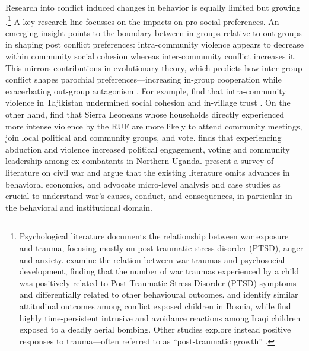 Research into conflict induced changes in behavior is equally limited but growing \citep{Blattman2010b}.\footnote{Psychological literature documents the relationship between war exposure and trauma, focusing mostly on post-traumatic stress disorder (PTSD), anger and anxiety. \citet{Macksoud1996a} examine the relation between war traumas and psychosocial development, finding that the number of war traumas experienced by a child was positively related to Post Traumatic Stress Disorder (PTSD) symptoms and differentially related to other behavioural outcomes. \citet{Smith2002} and \citet{Layne2010} identify similar attitudinal outcomes among conflict exposed children in Bosnia, while \citet{Dyregrov2002} find highly time-persistent intrusive and avoidance reactions among Iraqi children exposed to a deadly aerial bombing. Other studies explore instead positive responses to trauma––often referred to as ``post-traumatic growth'' \citep{Tedeschi1996,Powell2003,Staub2008,Vollhardt2009}.} A key research line focusses on the impacts on pro-social preferences. An emerging insight points to the boundary between in-groups relative to out-groups in shaping post conflict preferences: intra-community violence appears to decrease within community social cohesion whereas inter-community conflict increases it. This mirrors contributions in evolutionary theory, which predicts how inter-group conflict shapes parochial preferences—increasing in-group cooperation while exacerbating out-group antagonism \citep{Bowles2006b,Bernhard2006b,Choi2007a}. For example, \cite{CassarAlessandra} find that intra-community violence in Tajikistan undermined social cohesion and in-village trust \citep[see also][]{Rohner2013}. On the other hand, \cite{Bellows2009b} find that Sierra Leoneans whose households directly experienced more intense violence by the RUF are more likely to attend community meetings, join local political and community groups, and vote. \cite{Blattman2009a} finds that experiencing abduction and violence increased political engagement, voting and community leadership among ex-combatants in Northern Uganda. \cite{Blattman2010b} present a survey of literature on civil war and argue that the existing literature omits advances in behavioral economics, and advocate micro-level analysis and case studies as crucial to understand war’s causes, conduct, and consequences, in particular in the behavioral and institutional domain.  

